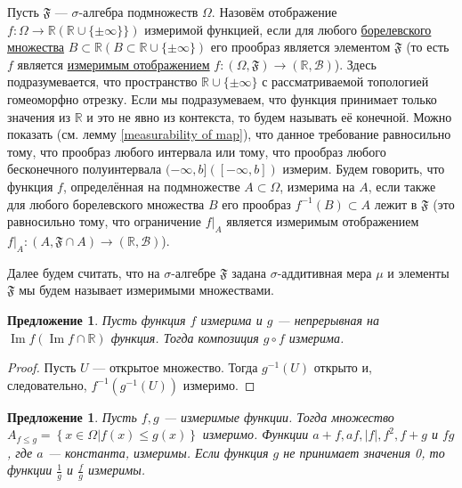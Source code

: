 \documentclass[12pt]{article}
\newtheorem{proposition}[theorem]{Предложение}
\numberwithin{theorem}{section}
\theoremstyle{definition}
\newcommand{\defin}[2]{\hypertarget{#2}{{\color{red} #1}}}
\newcommand{\RR}{\mathbb{R}}
\newcommand{\calB}{\mathcal{B}}
\newcommand{\events}{\mathfrak{F}}
\newcommand{\Image}{\operatorname{Im}}
\newcommand{\defineset}[2]{\left\{
	\left.
	#1
	\right\vert
	#2
	\right\}}
\begin{document}
	Пусть $ \events $ --- $ \sigma $-алгебра подмножеств $ \Omega $.
	Назовём отображение $ f \colon \Omega \to \RR (\RR \cup \{\pm\infty\}\}) $ 
	\defin{измеримой функцией}{measurable-function},
	если для любого \hyperlink{borel-sets}{борелевского множества} $ B \subset \RR (B \subset \RR \cup \{\pm\infty\}) $
	его прообраз является элементом $ \events $ (то есть $ f $ является \hyperlink{morphism-of-measurable-spaces}{измеримым отображением} 
	$ f \colon (\Omega, \events) \to (\RR, \calB) $).
	Здесь подразумевается, что пространство $ \RR \cup \{\pm\infty\} $ с рассматриваемой топологией
	гомеоморфно отрезку.
	Если мы подразумеваем, что функция принимает только значения из $ \RR $ и это не явно из контекста, 
	то будем называть её \defin{конечной}{finite}.
	Можно показать (см. лемму \ref{measurability of map}), что данное требование равносильно тому, что прообраз любого интервала
	или тому, что прообраз любого бесконечного полуинтервала $ (-\infty, b] ([-\infty, b]) $ измерим.
	Будем говорить, что функция $ f $, определённая на подмножестве $ A \subset \Omega $,
	\defin{измерима на $ A $}{locally-measurable}, если также для любого борелевского множества $ B $ его прообраз $ f^{-1}(B) \subset A $ лежит в $ \events $ 
	(это равносильно тому, что ограничение $ \left.f\right|_{A} $ является измеримым отображением
	$ \left.f\right|_{A} \colon (A, \events \cap A) \to (\RR, \calB) $).
	
	
	Далее будем считать, что на $ \sigma $-алгебре $ \events $ задана $ \sigma $-аддитивная мера $ \mu $
	и элементы $ \events $ мы будем называет измеримыми множествами.
	
	\begin{proposition} \label{composition with continuous}
		Пусть функция $ f $ измерима и $ g $ --- непрерывная на $ \Image f (\Image f \cap \RR) $ функция.
		Тогда композиция $ g \circ f $ измерима.
	\end{proposition}
	
	\begin{proof}
		Пусть $ U $ --- открытое множество.
		Тогда $ g^{-1}(U) $ открыто и, следовательно, $ f^{-1}(g^{-1}(U)) $ измеримо.
	\end{proof}
	
	\begin{proposition} \label{measurable functions are good}
		Пусть $ f, g $ --- измеримые функции.
		Тогда множество $ A_{f \leqslant g} = \defineset{x \in \Omega}{f(x) \leqslant g(x)} $
		измеримо.
		Функции $ a + f, af, |f|, f^2, f + g $ и $ fg $, где $ a $ --- константа, измеримы.
		Если функция $ g $ не принимает значения 0, то функции $ \tfrac{1}{g} $ и $ \tfrac{f}{g} $
		измеримы.
	\end{proposition}
	
\end{document}
